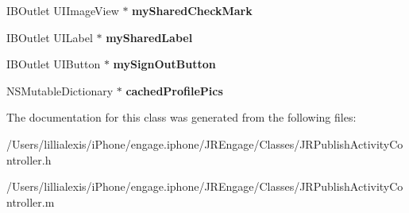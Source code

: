 \begin{DoxyCompactItemize}
\item 
\hypertarget{interface_j_r_publish_activity_controller_a767530df337c212edbeee71218187d6b}{
IBOutlet UIImageView $\ast$ {\bfseries mySharedCheckMark}}
\label{interface_j_r_publish_activity_controller_a767530df337c212edbeee71218187d6b}

\item 
\hypertarget{interface_j_r_publish_activity_controller_ab89d40f7285b7d33f8e26b99c940b1fb}{
IBOutlet UILabel $\ast$ {\bfseries mySharedLabel}}
\label{interface_j_r_publish_activity_controller_ab89d40f7285b7d33f8e26b99c940b1fb}

\item 
\hypertarget{interface_j_r_publish_activity_controller_a43e988807b1b1b6b3a05de17554190e4}{
IBOutlet UIButton $\ast$ {\bfseries mySignOutButton}}
\label{interface_j_r_publish_activity_controller_a43e988807b1b1b6b3a05de17554190e4}

\item 
\hypertarget{interface_j_r_publish_activity_controller_a58723d27f456e8e27a83e0e453580947}{
NSMutableDictionary $\ast$ {\bfseries cachedProfilePics}}
\label{interface_j_r_publish_activity_controller_a58723d27f456e8e27a83e0e453580947}

\end{DoxyCompactItemize}


The documentation for this class was generated from the following files:\begin{DoxyCompactItemize}
\item 
/Users/lillialexis/iPhone/engage.iphone/JREngage/Classes/JRPublishActivityController.h\item 
/Users/lillialexis/iPhone/engage.iphone/JREngage/Classes/JRPublishActivityController.m\end{DoxyCompactItemize}
